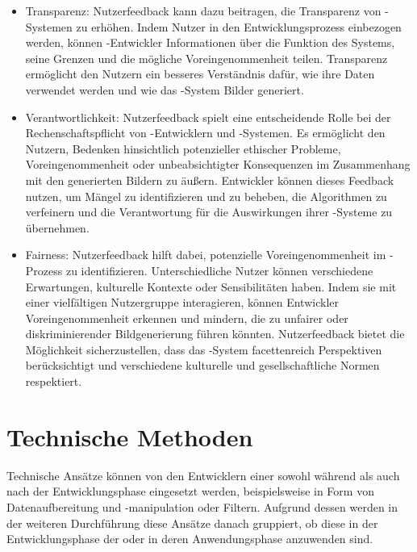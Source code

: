 \documentclass[hidelinks,12pt]{report}
\begin{document}
\begin{itemize}
	\item Transparenz: Nutzerfeedback kann dazu beitragen, die Transparenz von -Systemen zu erhöhen. Indem Nutzer in den Entwicklungsprozess einbezogen werden, können -Entwickler Informationen über die Funktion des Systems, seine Grenzen und die mögliche Voreingenommenheit teilen. Transparenz ermöglicht den Nutzern ein besseres Verständnis dafür, wie ihre Daten verwendet werden und wie das -System Bilder generiert.
	\item Verantwortlichkeit: Nutzerfeedback spielt eine entscheidende Rolle bei der Rechenschaftspflicht von -Entwicklern und -Systemen. Es ermöglicht den Nutzern, Bedenken hinsichtlich potenzieller ethischer Probleme, Voreingenommenheit oder unbeabsichtigter Konsequenzen im Zusammenhang mit den generierten Bildern zu äußern. Entwickler können dieses Feedback nutzen, um Mängel zu identifizieren und zu beheben, die Algorithmen zu verfeinern und die Verantwortung für die Auswirkungen ihrer -Systeme zu übernehmen.
	\item Fairness: Nutzerfeedback hilft dabei, potenzielle Voreingenommenheit im -Prozess zu identifizieren. Unterschiedliche Nutzer können verschiedene Erwartungen, kulturelle Kontexte oder Sensibilitäten haben. Indem sie mit einer vielfältigen Nutzergruppe interagieren, können Entwickler Voreingenommenheit erkennen und mindern, die zu unfairer oder diskriminierender Bildgenerierung führen könnten. Nutzerfeedback bietet die Möglichkeit sicherzustellen, dass das -System facettenreich Perspektiven berücksichtigt und verschiedene kulturelle und gesellschaftliche Normen respektiert.
\end{itemize}


\section{Technische Methoden}

Technische Ansätze können von den Entwicklern einer  sowohl während als auch nach der Entwicklungsphase eingesetzt werden, beispielsweise in Form von Datenaufbereitung und -manipulation oder Filtern. Aufgrund dessen werden in der weiteren Durchführung diese Ansätze danach gruppiert, ob diese in der Entwicklungsphase der  oder in deren Anwendungsphase anzuwenden sind.
\end{document}
